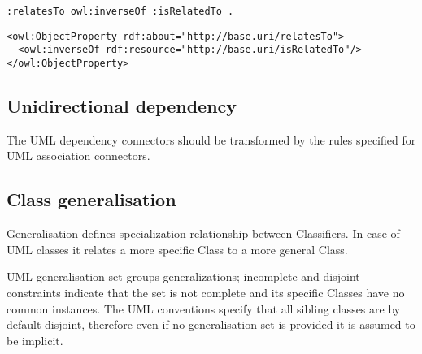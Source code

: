 \vspace{-\parskip}	
\begin{minipage}[b]{.385\textwidth}
\begin{lstlisting}[language=Turtle, caption={Declaring an inverse property in Turtle syntax}, captionpos=b]
:relatesTo owl:inverseOf :isRelatedTo .
\end{lstlisting}
\end{minipage}%
\quad\vspace{-\parskip}
\begin{minipage}[b]{.6\textwidth}
\begin{lstlisting}[language=RDF/XML, caption={Declaring an inverse property in RDF/XML syntax}, captionpos=b]
<owl:ObjectProperty rdf:about="http://base.uri/relatesTo">
  <owl:inverseOf rdf:resource="http://base.uri/isRelatedTo"/>
</owl:ObjectProperty>
\end{lstlisting}
\end{minipage}
\vspace{-\parskip}

\subsection{Unidirectional dependency}
\label{sec:dependecy}

The UML dependency connectors should be transformed by the rules specified for UML association connectors. 

\subsection{Class generalisation}
\label{sec:generalisation}

Generalisation \citep{uml2.5} defines specialization relationship between Classifiers. In case of UML classes it relates a more specific Class to a more general Class.

UML generalisation set \citep{uml2.5} groups generalizations; incomplete and disjoint constraints indicate that the set is not complete and its specific Classes have no common instances. The UML conventions \citep{costetchi2020b} specify that all sibling classes are by default disjoint, therefore even if no generalisation set is provided it is assumed to be implicit.

